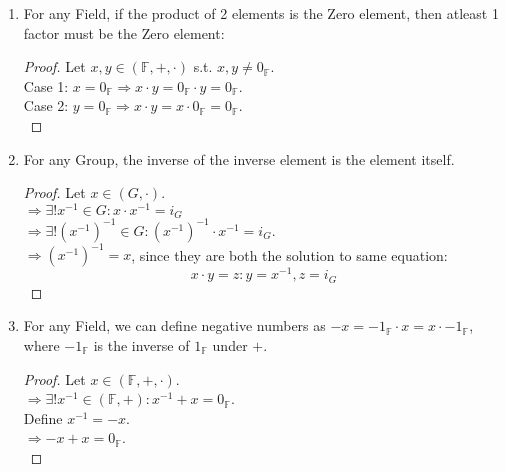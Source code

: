 \documentclass{article}
\begin{document}
\begin{enumerate}
\begin{proof}
					$\Rightarrow 0_{\mathbb{F}} \cdot x = i_{(\mathbb{F}, +)} \cdot x = (i_{(\mathbb{F}, +)} + i_{(\mathbb{F}, +)}) \cdot x = (i_{(\mathbb{F}, +)} \cdot x) + (i_{(\mathbb{F}, +)} \cdot x)$. \\
					Let $z = i_{(\mathbb{F}, +)} \cdot x$. \\
					$\Rightarrow z = z + z$. \\
					$\Rightarrow z + z^{-1} = (z + z) + z^{-1}$. \\
					$\Rightarrow z + z^{-1} = z + (z + z^{-1})$. \\
					$\Rightarrow i_{(\mathbb{F}, +)} = z + i_{(\mathbb{F}, +)}$. \\
					$\Rightarrow i_{(\mathbb{F}, +)} = z$. \\
					$\Rightarrow 0_{\mathbb{F}} = z$. \\
					$\Rightarrow 0_{\mathbb{F}} = 0_{\mathbb{F}} \cdot x$. \\

					$\Rightarrow x \cdot 0_{\mathbb{F}} = 0_{\mathbb{F}} \cdot x = 0_{\mathbb{F}}$.
				\end{proof}
				
				\item For any Field, if the product of 2 elements is the Zero element, then atleast 1 factor must be the Zero element:
				\begin{proof}
					Let $x, y \in (\mathbb{F}, +, \cdot)$ s.t. $x, y \neq 0_{\mathbb{F}}$. \\
					Case 1: $x = 0_{\mathbb{F}} \Rightarrow x \cdot y = 0_{\mathbb{F}} \cdot y = 0_{\mathbb{F}}$. \\
					Case 2: $y = 0_{\mathbb{F}} \Rightarrow x \cdot y = x \cdot 0_{\mathbb{F}} = 0_{\mathbb{F}}$. \\
				\end{proof}
				\item For any Group, the inverse of the inverse element is the element itself.
				\begin{proof}
					Let $x \in (G, \cdot)$. \\
					$\Rightarrow \exists ! x^{-1} \in G: x \cdot x^{-1} = i_G$ \\
					$\Rightarrow \exists ! ({x^{-1}})^{-1} \in G: ({x^{-1}})^{-1} \cdot x^{-1} = i_G$. \\
					$\Rightarrow ({x^{-1}})^{-1} = x$, since they are both the solution to same equation:
					$$x \cdot y = z: y = x^{-1}, z = i_G$$
				\end{proof}

				\item For any Field, we can define negative numbers as $-x = -1_\mathbb{F} \cdot x = x \cdot -1_\mathbb{F}$, where $-1_\mathbb{F}$ is the inverse of $1_\mathbb{F}$ under $+$. \\
				\begin{proof}
					Let $x \in (\mathbb{F}, +, \cdot)$. \\
					$\Rightarrow \exists !x^{-1} \in (\mathbb{F}, +): x^{-1} + x = 0_\mathbb{F}$. \\
					Define $x^{-1} = -x$. \\
					$\Rightarrow -x + x = 0_\mathbb{F}$. \\
					

\end{proof}
\end{enumerate}
\end{document}
